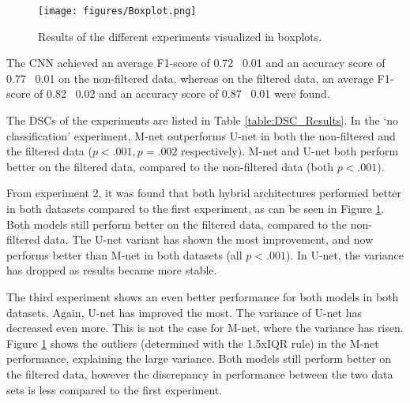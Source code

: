 
\begin{figure}[tb]
    \centering
    \texttt{[image: figures/Boxplot.png]}
    \caption{Results of the different experiments visualized in boxplots.}
    \label{fig:Boxplots}
\end{figure}

The CNN achieved an average F1-score of 0.72 \textpm\ 0.01 and an accuracy score of 0.77 \textpm\ 0.01 on the non-filtered data, whereas on the filtered data, an average F1-score of 0.82 \textpm\ 0.02 and an accuracy score of 0.87 \textpm\ 0.01 were found.

The DSCs of the experiments are listed in Table \ref{table:DSC_Results}. In the `no classification' experiment, M-net outperforms U-net in both the non-filtered and the filtered data ($p < .001, p = .002$ respectively). M-net and U-net both perform better on the filtered data, compared to the non-filtered data (both $p < .001$). 

From experiment 2, it was found that both hybrid architectures performed better in both datasets compared to the first experiment, as can be seen in Figure \ref{fig:Boxplots}. Both models still perform better on the filtered data, compared to the non-filtered data. The U-net variant has shown the most improvement, and now performs better than M-net in both datasets (all $p < .001$). In U-net, the variance has dropped as results became more stable. 

The third experiment shows an even better performance for both models in both datasets. Again, U-net has improved the most. The variance of U-net has decreased even more. This is not the case for M-net, where the variance has risen. Figure \ref{fig:Boxplots} shows the outliers (determined with the 1.5xIQR rule) in the M-net performance, explaining the large variance. Both models still perform better on the filtered data, however the discrepancy in performance between the two data sets is less compared to the first experiment. 

